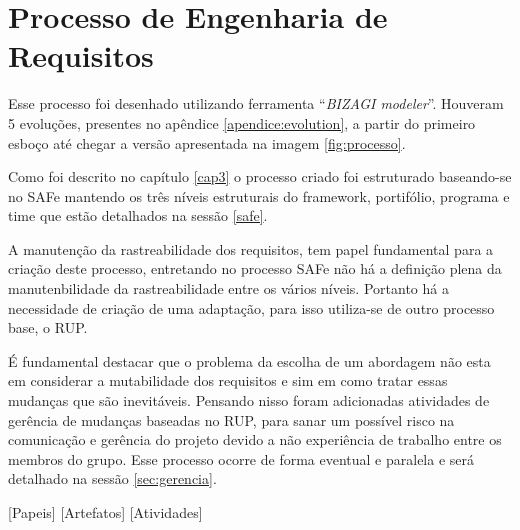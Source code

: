 \chapter[Processo de Engenharia de Requisitos]{Processo de Engenharia de Requisitos}\label{cap4}

Esse processo foi desenhado utilizando ferramenta ``\textit{BIZAGI modeler}''. Houveram 5 evoluções,
presentes no apêndice \ref{apendice:evolution}, a partir do primeiro esboço até chegar a versão apresentada na imagem \ref{fig:processo}.

Como foi descrito no capítulo \ref{cap3} o processo criado foi estruturado baseando-se no
SAFe mantendo os três níveis estruturais do framework, portifólio, programa e time
que estão detalhados na sessão \ref{safe}.

A manutenção da rastreabilidade dos requisitos, tem papel fundamental para a criação deste processo,
entretando no processo SAFe não há a definição plena da manutenbilidade da rastreabilidade entre os
vários níveis. Portanto há a necessidade de criação de uma adaptação, para isso utiliza-se de
outro processo base, o RUP.

É fundamental destacar que o problema da escolha de um abordagem não esta em considerar
a mutabilidade dos requisitos e sim em como tratar essas mudanças que são inevitáveis.
Pensando nisso foram adicionadas atividades de gerência de mudanças baseadas no RUP,
para sanar um possível risco na comunicação e gerência do projeto devido a não experiência
de trabalho entre os membros do grupo. Esse processo ocorre de forma eventual e paralela
e será detalhado na sessão \ref{sec:gerencia}.

[Papeis]
[Artefatos]
[Atividades]

